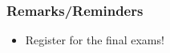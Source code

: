 

\begin{frame}
	\frametitle{Remarks/Reminders}
	\begin{itemize}
		\item Register for the final exams!
	\end{itemize}
	
\end{frame}

